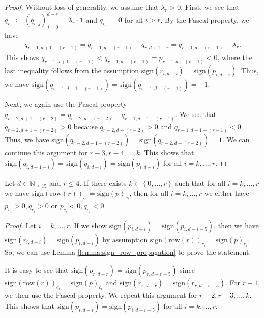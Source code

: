 \begin{proof}
    Without loss of generality, we assume that \( \lambda_r > 0 \).
    First, we see that \( q_{r, \cdot} \coloneqq (q_{r,j})_{j=0}^{d-r} = \lambda_r \cdot \mathbf{1} \) and \( q_{i,\cdot} =  \mathbf{0} \) for all \( i > r \). By the Pascal property, we have 
    \begin{align*}
        q_{r-1,d+1-(r-1)} = q_{r-1,d-(r-1)} - q_{r,d+1-r} = q_{r-1,d-(r-1)} - \lambda_r.
    \end{align*}
    This shows \( q_{r-1,d+1-(r-1)} < q_{r-1,d-(r-1)} = p_{r-1,d-(r-1)} < 0 \), where the last inequality follows from the assumption $\mathrm{sign}(r_{i,d-i}) = \mathrm{sign}(p_{i,d-i})$. Thus, we have \( \mathrm{sign}(q_{r-1,d+1-(r-1)}) = \mathrm{sign}(q_{r-1,d-(r-1)}) = \mathbf -1\). 
    
    Next, we again use the Pascal property \( q_{r-2,d+1-(r-2)} = q_{r-2,d-(r-2)} - q_{r-1,d+1-(r-1)} \). We see that \( q_{r-2,d+1-(r-2)} > 0 \) because \( q_{r-2,d-(r-2)} > 0 \) and \( q_{r-1,d+1-(r-1)} < 0 \). Thus, we have \( \mathrm{sign}(q_{r-2,d+1-(r-2)}) = \mathrm{sign}(q_{r-2,d-(r-2)}) = 1 \). We can continue this argument for \( r-3, r-4, \dots, k \). This shows that \( \mathrm{sign}(q_{i,d+1-i}) = \mathrm{sign}(q_{i,d-i}) = \mathrm{sign}(p_{i,d-i}) \) for all \( i = k, \dots, r\).
\end{proof}

\begin{lemma}\label{lemma:same_sign_propagation_easy}
    Let \( d \in \mathbb{N}_{\geq 15} \) and \( r \leq 4 \). If there exists \( k \in \left\{ 0, \dots, r \right\} \) such that for all \( i = k, \dots, r\) we have \(  \mathrm{sign}(\mathrm{row}(r))_{c_i} = \mathrm{sign}(p)_{c_i} \),
    then for all \( i = k, \dots, r\) we either have \( p_{c_i} > 0, q_{c_i} > 0 \) or \( p_{c_i} < 0, q_{c_i} < 0 \).
\end{lemma}
  
\begin{proof}
    Let \( i=k, \dots, r \). If we show \( \mathrm{sign}(p_{i,d-i}) = \mathrm{sign}(p_{i,d-i-5}) \), then we have $\mathrm{sign}(r_{i,d-i}) = \mathrm{sign}(p_{i,d-i})$ by assumption \( \mathrm{sign}(\mathrm{row}(r))_{c_i} = \mathrm{sign}(p)_{c_i} \). So, we can use Lemma \ref{lemma:sign_row_propagation} to prove the statement.

    It is easy to see that \( \mathrm{sign}(p_{r,d-r}) = \mathrm{sign}(p_{r,d-r-5}) \) since \( \mathrm{sign}(\mathrm{row}(r))_{c_r} = \mathrm{sign}(p)_{c_r} \) and \( \mathrm{sign}(r_{r,d-r}) = \mathrm{sign}(r_{r, d - r - 5}) \). For \( r - 1 \), we then use the Pascal property. We repeat this argument for \( r-2, r-3, \dots, k \). This shows that \( \mathrm{sign}(p_{i,d-i}) = \mathrm{sign}(p_{i,d-i-5}) \) for all \( i = k, \dots, r \).
\end{proof}

